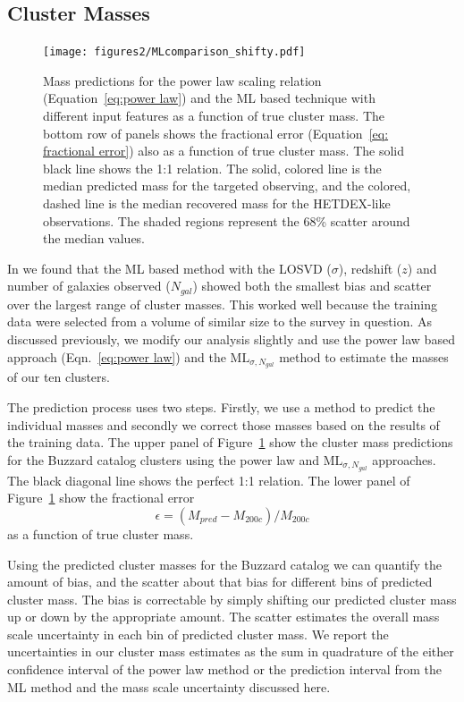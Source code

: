 \subsection{Cluster Masses}
\begin{figure}
	\centering 
	\texttt{[image: figures2/MLcomparison\_shifty.pdf]} 
	\caption{Mass predictions for the power law scaling relation (Equation~\ref{eq:power law}) and the ML based technique with different input features as a function of true cluster mass. The bottom row of panels shows the fractional error (Equation~\ref{eq: fractional error}) also as a function of true cluster mass. The solid black line shows the 1:1 relation. The solid, colored line is the median predicted mass for the targeted observing, and the colored, dashed line is the median recovered mass for the HETDEX-like observations. The shaded regions represent the 68\% scatter around the median values.} \label{fig: ML comparison} 
\end{figure}

In  we found that the ML based method with the LOSVD ($\sigma$), redshift ($z$) and number of galaxies observed ($N_{gal}$) showed both the smallest bias and scatter over the largest range of cluster masses. This worked well because the training data were selected from a volume of similar size to the survey in question. As discussed previously, we modify our analysis slightly and use the power law based approach (Eqn.~\ref{eq:power law}) and the $\mathrm{ML}_{\sigma, N_{gal}}$ method to estimate the masses of our ten clusters.

The prediction process uses two steps. Firstly, we use a method to predict the individual masses and secondly we correct those masses based on the results of the training data. The upper panel of Figure~\ref{fig: ML comparison} show the cluster mass predictions for the Buzzard catalog clusters using the power law and $\mathrm{ML}_{\sigma, N_{gal}}$ approaches. The black diagonal line shows the perfect 1:1 relation. The lower panel of Figure~\ref{fig: ML comparison} show the fractional error 
\begin{equation}\label{eq: fractional error}
	\epsilon = (M_{pred} - M_{200c})/M_{200c}
\end{equation}
as a function of true cluster mass.

Using the predicted cluster masses for the Buzzard catalog we can quantify the amount of bias, and the scatter about that bias for different bins of predicted cluster mass. The bias is correctable by simply shifting our predicted cluster mass up or down by the appropriate amount. The scatter estimates the overall mass scale uncertainty in each bin of predicted cluster mass. We report the uncertainties in our cluster mass estimates as the sum in quadrature of the either confidence interval of the power law method or the prediction interval from the ML method and the mass scale uncertainty discussed here. 

